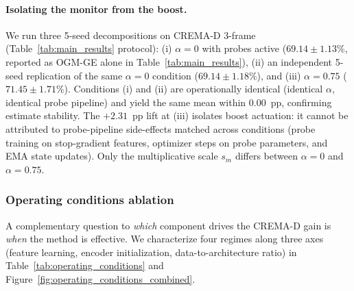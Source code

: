 \documentclass{article}
\begin{document}
\paragraph{Isolating the monitor from the boost.} We run three 5-seed decompositions on CREMA-D 3-frame (Table~\ref{tab:main_results} protocol): (i) $\alpha{=}0$ with probes active ($69.14 \pm 1.13\%$, reported as OGM-GE alone in Table~\ref{tab:main_results}), (ii) an independent 5-seed replication of the same $\alpha{=}0$ condition ($69.14 \pm 1.18\%$), and (iii) $\alpha{=}0.75$ ($71.45 \pm 1.71\%$). Conditions (i) and (ii) are operationally identical (identical $\alpha$, identical probe pipeline) and yield the same mean within $0.00$~pp, confirming estimate stability. The $+2.31$~pp lift at (iii) isolates boost actuation: it cannot be attributed to probe-pipeline side-effects matched across conditions (probe training on stop-gradient features, optimizer steps on probe parameters, and EMA state updates). Only the multiplicative scale $s_m$ differs between $\alpha{=}0$ and $\alpha{=}0.75$.
\vspace{-1em}


\subsubsection{Operating conditions ablation}
\label{sec:operating_conditions}
\vspace{-1em}

A complementary question to \emph{which} component drives the CREMA-D gain is \emph{when} the method is effective. We characterize four regimes along three axes (feature learning, encoder initialization, data-to-architecture ratio) in Table~\ref{tab:operating_conditions} and Figure~\ref{fig:operating_conditions_combined}.
\vspace{-1.2em}
\end{document}
